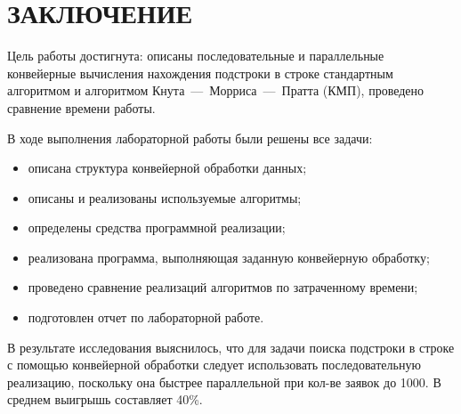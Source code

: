 \section*{ЗАКЛЮЧЕНИЕ}

Цель работы достигнута: описаны последовательные и параллельные конвейерные вычисления нахождения подстроки в строке стандартным алгоритмом и алгоритмом Кнута~---~Морриса~---~Пратта (КМП), проведено сравнение времени работы.

В ходе выполнения лабораторной работы были решены все задачи:
\begin{itemize}
	\item описана структура конвейерной обработки данных;
	\item описаны и реализованы используемые алгоритмы;
	\item определены средства программной реализации;
	\item реализована программа, выполняющая заданную конвейерную обработку;
	\item проведено сравнение реализаций алгоритмов по затраченному времени;
	\item подготовлен отчет по лабораторной работе.
\end{itemize}

В результате исследования выяснилось, что для задачи поиска подстроки в строке с помощью конвейерной обработки следует использовать последовательную реализацию, поскольку она быстрее параллельной при кол-ве заявок до 1000. 
В среднем выигрышь составляет 40\%.